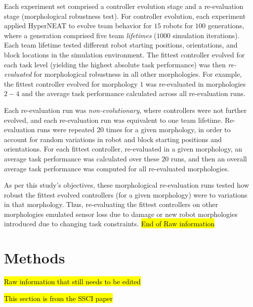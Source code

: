 \documentclass[conference]{IEEEtran}
\begin{document}
Each experiment set comprised a controller evolution stage and a re-evaluation stage
(morphological robustness test).
For controller evolution, each experiment applied HyperNEAT to evolve team behavior for
$15$ robots for $100$ generations,
where a generation comprised five team \textit{lifetimes} ($1000$ simulation iterations).
Each team lifetime tested different robot starting positions, orientations, and block locations
in the simulation environment.
The fittest controller evolved for each task level (yielding the highest absolute task performance)
was then \textit{re-evaluated} for morphological robustness in all other morphologies.
For example, the fittest controller evolved for morphology $1$ was re-evaluated in morphologies
$2-4$ and the average task performance calculated across all re-evaluation runs.

Each re-evaluation run was \textit{non-evolutionary}, where controllers were not further evolved,
and each re-evaluation run was equivalent to one team lifetime.
Re-evaluation runs were repeated $20$ times for a given morphology, in order to account for random variations in robot and block
starting positions and orientations.
For each fittest controller, re-evaluated in a given morphology, an average task performance was
calculated over these $20$ runs, and then an overall average task performance was computed for
all re-evaluated morphologies.

As per this study's objectives, these morphological re-evaluation
runs tested how robust the fittest evolved controllers (for a given morphology) were to variations
in that morphology.
Thus, re-evaluating the fittest controllers on other morphologies emulated sensor loss due
to damage or new robot morphologies introduced due to changing task constraints.
\hl{End of Raw information}

\section{Methods}
\hl{Raw information that still needs to be edited}

\hl{This section is from the SSCI paper}
\end{document}
